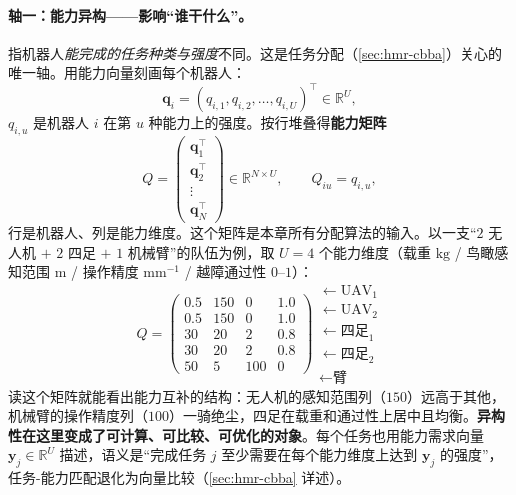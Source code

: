 \paragraph{轴一：能力异构——影响“谁干什么”。}
指机器人\emph{能完成的任务种类与强度}不同。这是任务分配（\cref{sec:hmr-cbba}）关心的唯一轴。用能力向量刻画每个机器人：
\begin{equation}
  \mathbf{q}_i = (q_{i,1},q_{i,2},\dots,q_{i,U})^\top \in \mathbb{R}^U,
  \label{eq:hmr-qi}
\end{equation}
$q_{i,u}$ 是机器人 $i$ 在第 $u$ 种能力上的强度。按行堆叠得\textbf{能力矩阵}
\begin{equation}
  Q = \begin{pmatrix}\mathbf{q}_1^\top\\\mathbf{q}_2^\top\\\vdots\\\mathbf{q}_N^\top\end{pmatrix}\in\mathbb{R}^{N\times U},\qquad Q_{iu}=q_{i,u},
  \label{eq:hmr-Q}
\end{equation}
行是机器人、列是能力维度。这个矩阵是本章所有分配算法的输入。以一支“$2$ 无人机 $+$ $2$ 四足 $+$ $1$ 机械臂”的队伍为例，取 $U=4$ 个能力维度（载重 $\mathrm{kg}$ / 鸟瞰感知范围 $\mathrm{m}$ / 操作精度 $\mathrm{mm}^{-1}$ / 越障通过性 $0$--$1$）：
\begin{equation}
  Q = \begin{pmatrix}
  0.5 & 150 & 0 & 1.0 \\
  0.5 & 150 & 0 & 1.0 \\
  30 & 20 & 2 & 0.8 \\
  30 & 20 & 2 & 0.8 \\
  50 & 5 & 100 & 0
  \end{pmatrix}
  \begin{array}{l}
  \leftarrow \mathrm{UAV}_1 \\ \leftarrow \mathrm{UAV}_2 \\ \leftarrow \text{四足}_1 \\ \leftarrow \text{四足}_2 \\ \leftarrow \text{臂}
  \end{array}
  \label{eq:hmr-Q-example}
\end{equation}
读这个矩阵就能看出能力互补的结构：无人机的感知范围列（$150$）远高于其他，机械臂的操作精度列（$100$）一骑绝尘，四足在载重和通过性上居中且均衡。\textbf{异构性在这里变成了可计算、可比较、可优化的对象}。每个任务也用能力需求向量 $\mathbf{y}_j\in\mathbb{R}^U$ 描述，语义是“完成任务 $j$ 至少需要在每个能力维度上达到 $\mathbf{y}_j$ 的强度”，任务-能力匹配退化为向量比较（\cref{sec:hmr-cbba} 详述）。


